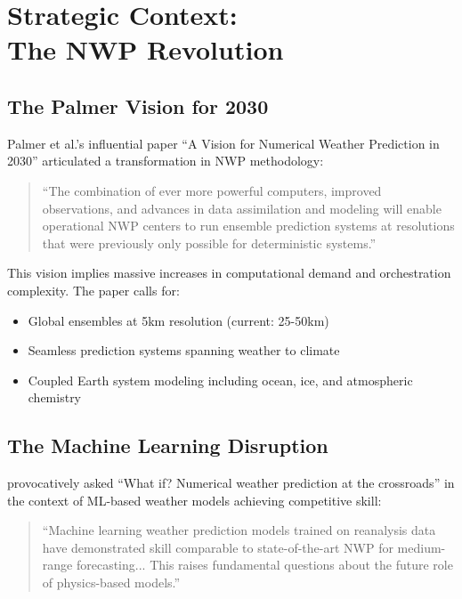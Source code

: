 \documentclass[11pt,twocolumn]{article}
\begin{document}
\section{Strategic Context:\\ The NWP Revolution}

\subsection{The Palmer Vision for 2030}

Palmer et al.'s influential paper ``A Vision for Numerical Weather Prediction in 2030'' \cite{palmer2020vision} articulated a transformation in NWP methodology:

\begin{quote}
``The combination of ever more powerful computers, improved observations, and advances in data assimilation and modeling will enable operational NWP centers to run ensemble prediction systems at resolutions that were previously only possible for deterministic systems.''
\end{quote}

This vision implies massive increases in computational demand and orchestration complexity. The paper calls for:
\begin{itemize}
    \item Global ensembles at 5km resolution (current: 25-50km)
    \item Seamless prediction systems spanning weather to climate
    \item Coupled Earth system modeling including ocean, ice, and atmospheric chemistry
\end{itemize}

\subsection{The Machine Learning Disruption}

\cite{bauer2024nwp_crossroads} provocatively asked ``What if? Numerical weather prediction at the crossroads'' in the context of ML-based weather models achieving competitive skill:

\begin{quote}
``Machine learning weather prediction models trained on reanalysis data have demonstrated skill comparable to state-of-the-art NWP for medium-range forecasting... This raises fundamental questions about the future role of physics-based models.''
\end{quote}
\end{document}
